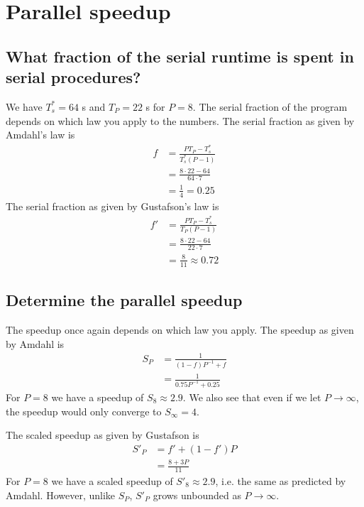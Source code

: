 \documentclass{article}
\begin{document}
\section{Parallel speedup}
\subsection{What fraction of the serial runtime is spent in serial procedures?}
We have $T^*_s = 64$ s and $T_P = 22$ s for $P=8$.
The serial fraction of the program depends on which law you apply to the numbers.
The serial fraction as given by Amdahl's law is
\begin{equation}
  \begin{aligned}
    f
    &= \frac{PT_P - T^*_s}{T^*_s\left( P - 1 \right)} \\
    &= \frac{8\cdot 22 - 64}{64\cdot 7} \\
    &= \frac{1}{4} = 0.25
  \end{aligned}
\end{equation}
The serial fraction as given by Gustafson's law is
\begin{equation}
  \begin{aligned}
    f'
    &= \frac{PT_P - T^*_s}{T_P\left( P - 1 \right)} \\
    &= \frac{8\cdot 22 - 64}{22\cdot 7} \\
    &= \frac{8}{11} \approx 0.72
  \end{aligned}
\end{equation}

\subsection{Determine the parallel speedup}
The speedup once again depends on which law you apply.
The speedup as given by Amdahl is
\begin{equation}
  \begin{aligned}
    S_P
    &= \frac{1}{\left( 1-f \right)P^{-1} + f} \\
    &= \frac{1}{0.75P^{-1} + 0.25}
  \end{aligned}
\end{equation}
For $P=8$ we have a speedup of $S_8 \approx 2.9$.
We also see that even if we let $P\rightarrow\infty$,
the speedup would only converge to $S_\infty = 4$.

The scaled speedup as given by Gustafson is
\begin{equation}
  \begin{aligned}
    S'_P
    &= f' + (1 - f')P \\
    &= \frac{8 + 3P}{11}
  \end{aligned}
\end{equation}
For $P=8$ we have a scaled speedup of $S'_8 \approx 2.9$,
i.e. the same as predicted by Amdahl.
However, unlike $S_P$, $S'_P$ grows unbounded as $P\rightarrow\infty$.
\end{document}
